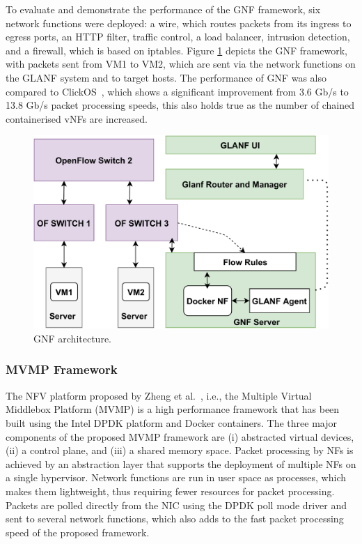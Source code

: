 \documentclass[futureinternet,review,accept,pdftex,moreauthors]{Definitions/mdpi}
\begin{document}
To evaluate and demonstrate the performance of the GNF framework, six network functions were deployed: a wire, which routes packets from its ingress to egress ports, an HTTP filter, traffic control, a load balancer, intrusion detection, and a firewall, which is based on iptables. Figure \ref{GNF-figure} depicts the GNF framework, with packets sent from VM1 to VM2, which are sent via the network functions on the GLANF system and to target hosts. The performance of GNF was also compared to ClickOS~\cite{martins2014clickos}, which shows a significant improvement from 3.6 Gb/s to 13.8 Gb/s packet processing speeds, this also holds true as the number of chained containerised vNFs are increased.


\begin{figure}[H]%
\includegraphics[width=.9\columnwidth]{GNF.pdf}
\caption{GNF architecture.}
\label{GNF-figure}
\end{figure}


\subsubsection{MVMP Framework}
The NFV platform proposed by Zheng {et al.}~\cite{zheng2018flexible}, i.e., the Multiple Virtual Middlebox Platform (MVMP) is a high performance framework that has been built using the Intel DPDK platform and Docker containers. The three major components of the proposed MVMP framework are (i) abstracted virtual devices, (ii) a control plane, and (iii) a shared memory space. Packet processing by NFs is achieved by an abstraction layer that supports the deployment of multiple NFs on a single hypervisor. Network functions are run in user space as processes, which makes them lightweight, thus requiring fewer resources for packet processing. Packets are polled directly from the NIC using the DPDK poll mode driver and sent to several network functions, which also adds to the fast packet processing speed of the proposed framework.
\end{document}
